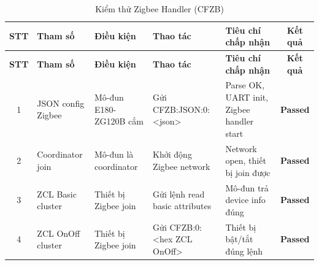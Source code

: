         \begin{longtable}{|c|p{}|p{}|p{}|p{}|c|}
            \caption{Kiểm thử Zigbee Handler (CFZB)}
            \label{tab:test_zigbee_handler} \\
            \hline
            \textbf{STT} & \textbf{Tham số} & \textbf{Điều kiện} & \textbf{Thao tác} & \textbf{Tiêu chí chấp nhận} & \textbf{Kết quả} \\ \hline
            \endfirsthead
            \hline
            \textbf{STT} & \textbf{Tham số} & \textbf{Điều kiện} & \textbf{Thao tác} & \textbf{Tiêu chí chấp nhận} & \textbf{Kết quả} \\ \hline
            \endhead
            \hline
            \endfoot
            \endlastfoot
        
            1 & JSON config Zigbee & Mô-đun E180-ZG120B cắm & Gửi CFZB:JSON:0:\newline<json> & Parse OK, UART init, Zigbee handler start & \textcolor{modern_blue}{\textbf{Passed}} \\ \hline
            2 & Coordinator join & Mô-đun là coordinator & Khởi động Zigbee network & Network open, thiết bị join được & \textcolor{modern_blue}{\textbf{Passed}} \\ \hline
            3 & ZCL Basic cluster & Thiết bị Zigbee join & Gửi lệnh read basic attributes & Mô-đun trả device info đúng & \textcolor{modern_blue}{\textbf{Passed}} \\ \hline
            4 & ZCL OnOff cluster & Thiết bị Zigbee join & Gửi CFZB:0:<hex ZCL OnOff> & Thiết bị bật/tắt đúng lệnh & \textcolor{modern_blue}{\textbf{Passed}} \\ \hline
        \end{longtable}
        
